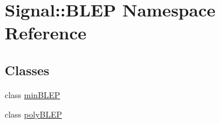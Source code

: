 \hypertarget{namespace_signal_1_1_b_l_e_p}{\section{Signal\+:\+:B\+L\+E\+P Namespace Reference}
\label{namespace_signal_1_1_b_l_e_p}
}
\subsection*{Classes}
\begin{DoxyCompactItemize}
\item 
class \hyperlink{class_signal_1_1_b_l_e_p_1_1min_b_l_e_p}{min\+B\+L\+E\+P}
\item 
class \hyperlink{class_signal_1_1_b_l_e_p_1_1poly_b_l_e_p}{poly\+B\+L\+E\+P}
\end{DoxyCompactItemize}
